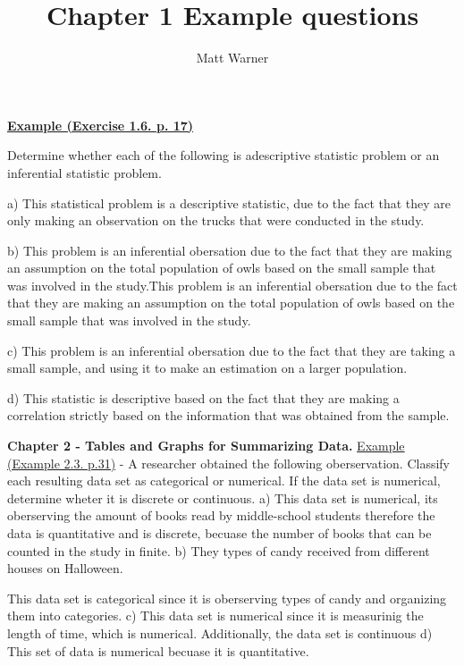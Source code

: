 \documentclass{report}
\title{\Huge{Chapter 1 Example questions}}
\author{\huge{Matt Warner}}
\date{\huge{}}
\begin{document}
  \maketitle





 \noindent  
\begin{large}
  \textbf{\underline{Example (Exercise 1.6. p. 17)}} 
  \vspace{3mm}

\noindent Determine whether each of the following is adescriptive statistic problem or an inferential statistic problem.
\end{large}
\bigbreak \noindent
a) This statistical problem is a descriptive statistic, due to the fact that they are only making an observation on the trucks that were conducted in the study.
\vspace{3mm}

\noindent b) This problem is an inferential obersation due to the fact that they are making an assumption on the total population of owls based on the small sample that was involved in the study.This problem is an inferential obersation due to the fact that they are making an assumption on the total population of owls based on the small sample that was involved in the study.
\vspace{3mm}

\noindent c) This problem is an inferential obersation due to the fact that they are taking a small sample, and using it to make an estimation on a larger population.
\vspace{3mm}

\noindent d) This statistic is descriptive based on the fact that they are making a correlation strictly based on the information that was obtained from the sample. 

\bigbreak \noindent \bigbreak \noindent
\begin{large}
  \textbf{Chapter 2 - Tables and Graphs for Summarizing Data.} 
  \bigbreak \noindent
  \underline{Example (Example 2.3. p.31)}
   - A researcher obtained the following oberservation. Classify each resulting data set as categorical or numerical. If the data set is numerical, determine wheter it is discrete or continuous.
  \bigbreak \noindent
  a) This data set is numerical, its oberserving the amount of books read by middle-school students therefore the data is quantitative and is discrete, becuase the number of books that can be counted in the study in finite.
  \bigbreak \noindent
  b) They types of candy received from different houses on Halloween.
  \vspace{2mm}


    \noindent This data set is categorical since it is oberserving types of candy and organizing them into categories. 
  \bigbreak \noindent
  c) This data set is numerical since it is measurinig the length of time, which is numerical. Additionally, the data set is continuous
\bigbreak \noindent
d) This set of data is numerical becuase it is quantitative. 
\end{large}
\end{document}
